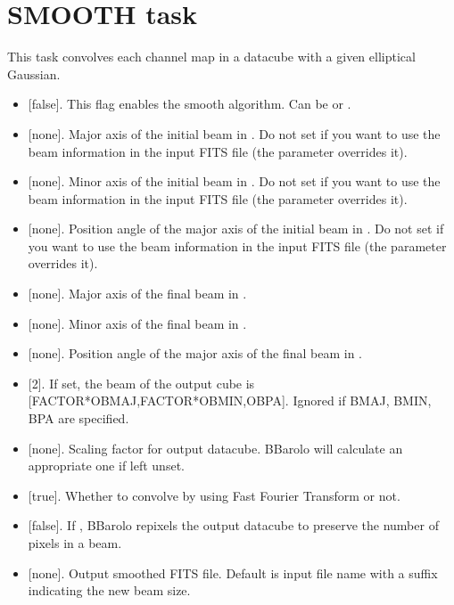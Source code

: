\documentclass[letterpaper,10pt,english]{sphinxmanual}
\begin{document}
\section{SMOOTH task}
\label{\detokenize{tasks:smooth-task}}\label{\detokenize{tasks:smoothtask}}
This task convolves each channel map in a datacube with a given elliptical Gaussian.
\begin{itemize}
\item {} 
 {[}false{]}. This flag enables the smooth algorithm. Can be  or .

\item {} 
 {[}none{]}. Major axis of the initial beam in . Do not set if you want to use the beam information in the input FITS file (the parameter overrides it).

\item {} 
 {[}none{]}. Minor axis of the initial beam in . Do not set if you want to use the beam information in the input FITS file (the parameter overrides it).

\item {} 
 {[}none{]}. Position angle of the major axis of the initial beam in . Do not set if you want to use the beam information in the input FITS file (the parameter overrides it).

\item {} 
 {[}none{]}. Major axis of the final beam in .

\item {} 
 {[}none{]}. Minor axis of the final beam in .

\item {} 
 {[}none{]}. Position angle of the major axis of the final beam in .

\item {} 
 {[}2{]}. If set, the beam of the output cube is {[}FACTOR*OBMAJ,FACTOR*OBMIN,OBPA{]}. Ignored if BMAJ, BMIN, BPA are specified.

\item {} 
 {[}none{]}. Scaling factor for output datacube. BBarolo will calculate an appropriate one if left unset.

\item {} 
 {[}true{]}. Whether to convolve by using Fast Fourier Transform or not.

\item {} 
 {[}false{]}. If , BBarolo repixels the output datacube to preserve the number of pixels in a beam.

\item {} 
 {[}none{]}. Output smoothed FITS file. Default is input file name with a suffix indicating the new beam size.

\end{itemize}
\end{document}
